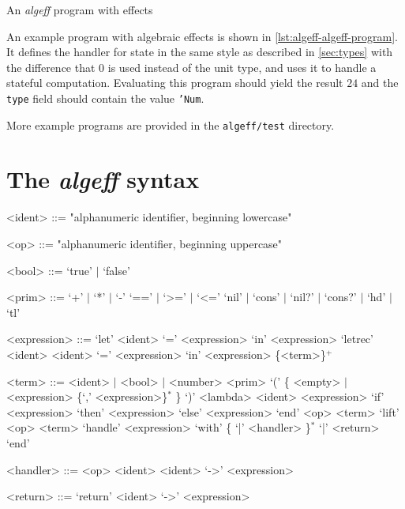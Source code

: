 \documentclass[inz, english, longabstract]{iithesis}
\begin{document}
\begin{listing}[t]
  \caption{An \emph{algeff} program with effects}
  \label{lst:algeff-algeff-program}
\end{listing}

An example program with algebraic effects is shown in \autoref{lst:algeff-algeff-program}.
It defines the handler for state in the same style as described in \autoref{sec:types} with the difference that $0$ is used instead of the unit type, and uses it to handle a stateful computation.
Evaluating this program should yield the result $24$ and the \texttt{type} field should contain the value \texttt{'Num}.

More example programs are provided in the \texttt{algeff/test} directory.

\section{The \emph{algeff} syntax}
\begin{grammar}
<ident> ::= "alphanumeric identifier, beginning lowercase"

<op> ::= "alphanumeric identifier, beginning uppercase"

<bool> ::= `true' $\mid$ `false'

<prim> ::= `+' $\mid$ `*' $\mid$ `-'
  \alt `==' $\mid$ `>=' $\mid$ `<='
  \alt `nil' $\mid$ `cons' $\mid$ `nil?' $\mid$ `cons?' $\mid$ `hd' $\mid$ `tl'

<expression> ::= `let' <ident> `=' <expression> `in' <expression>
  \alt `letrec' <ident> <ident> `=' <expression> `in' <expression>
  \alt \{<term>\}$^+$

<term> ::= <ident> $\mid$ <bool> $\mid$ <number>
  \alt <prim> `(' \{ <empty> $\mid$ <expression> \{`,' <expression>\}$^*$ \} `)'
  \alt <lambda> <ident> <expression>
  \alt `if' <expression> `then' <expression> `else' <expression> `end'
  \alt <op> <term>
  \alt `lift' <op> <term>
  \alt `handle' <expression> `with' \{ `|' <handler> \}$^*$ `|' <return> `end'

<handler> ::= <op> <ident> <ident> `->' <expression>

<return> ::= `return' <ident> `->' <expression>
  
\end{grammar}


\printbibliography[heading=bibintoc]
\end{document}
